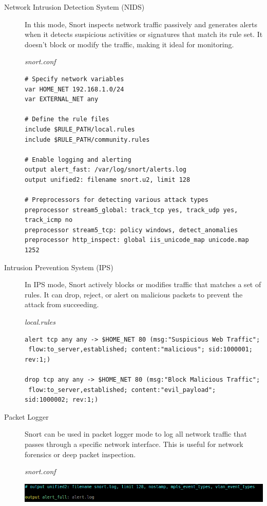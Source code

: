 \documentclass[12pt,a4paper]{report}
\begin{document}
\begin{description}
   \item[Network Intrusion Detection System (NIDS)] In this mode, Snort inspects network traffic passively and generates alerts when it detects suspicious activities or signatures that match its rule set. It doesn't block or modify the traffic, making it ideal for monitoring.
   
   \textit{snort.conf}
   \begin{verbatim}
# Specify network variables
var HOME_NET 192.168.1.0/24
var EXTERNAL_NET any

# Define the rule files
include $RULE_PATH/local.rules
include $RULE_PATH/community.rules

# Enable logging and alerting
output alert_fast: /var/log/snort/alerts.log
output unified2: filename snort.u2, limit 128

# Preprocessors for detecting various attack types
preprocessor stream5_global: track_tcp yes, track_udp yes, track_icmp no
preprocessor stream5_tcp: policy windows, detect_anomalies
preprocessor http_inspect: global iis_unicode_map unicode.map 1252

	\end{verbatim}
   
   
	\item[Intrusion Prevention System (IPS)] In IPS mode, Snort actively blocks or modifies traffic that matches a set of rules. It can drop, reject, or alert on malicious packets to prevent the attack from succeeding.
	
	\textit{local.rules}
	
	\begin{verbatim}
alert tcp any any -> $HOME_NET 80 (msg:"Suspicious Web Traffic";
 flow:to_server,established; content:"malicious"; sid:1000001; rev:1;)
 
drop tcp any any -> $HOME_NET 80 (msg:"Block Malicious Traffic";
 flow:to_server,established; content:"evil_payload"; sid:1000002; rev:1;)

	\end{verbatim}
      
	\item[Packet Logger] Snort can be used in packet logger mode to log all network traffic that passes through a specific network interface. This is useful for network forensics or deep packet inspection.
	
	\textit{snort.conf}
	
	\includegraphics[scale=.5]{remmina_lab-71b59751-cf7c-46af-9c75-5b732ca5c73e.australiaeast.cloudapp.azure.com_7095_lab-71b59751-cf7c-46af-9c75-5b732ca5c73e.australiaeast.cloudapp.azure.com_7095_20241002-065916.png} 	
\end{description}
\end{document}
